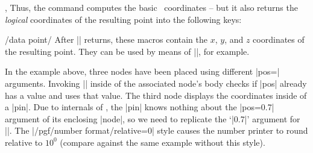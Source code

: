 {\begin{commandlist}{\pgfplotspointplotattime,\pgfplotspointplotattime{}}
	Thus, the command computes the basic \pgfname\ coordinates -- but it also returns the \emph{logical} coordinates of the resulting point into the following keys:
\begin{pgfplotsxykeylist}{/data point/\x}
	After |\pgfplotspointplotattime| returns, these macros contain the $x$, $y$, and $z$ coordinates of the resulting point. They can be used by means of ||, for example.
\begin{codeexample}[]
\end{codeexample}

	In the example above, three nodes have been placed using different |pos=| arguments. Invoking |\pgfplotspointplotattime| inside of the associated node's body checks if |pos| already has a value and uses that value. The third node displays the coordinates inside of a |pin|. Due to internals of \tikzname, the |pin| knows nothing about the |pos=0.7| argument of its enclosing |node|, so we need to replicate the `|0.7|' argument for ||. The |/pgf/number format/relative=0| style causes the number printer to round relative to $10^0$ (compare against the same example without this style).


\end{pgfplotsxykeylist}
\end{commandlist}}
